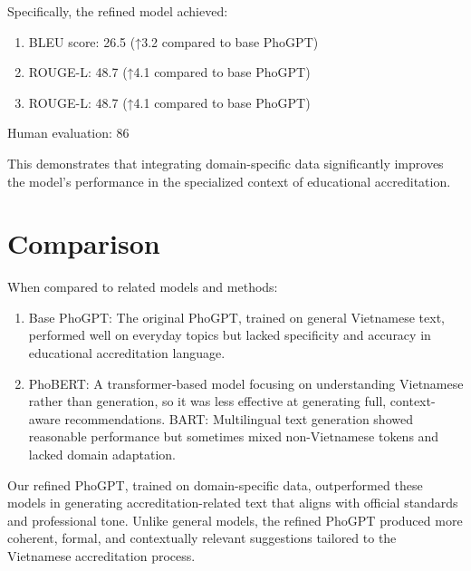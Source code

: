 Specifically, the refined model achieved:

\begin{enumerate}
    \item BLEU score: 26.5 (↑3.2 compared to base PhoGPT)
    \item ROUGE-L: 48.7 (↑4.1 compared to base PhoGPT)
    \item ROUGE-L: 48.7 (↑4.1 compared to base PhoGPT)
\end{enumerate}

Human evaluation: 86%

This demonstrates that integrating domain-specific data significantly improves the model's performance in the specialized context of educational accreditation.
\section{Comparison}
When compared to related models and methods:

\begin{enumerate}
    \item Base PhoGPT: The original PhoGPT, trained on general Vietnamese text, performed well on everyday topics but lacked specificity and accuracy in educational accreditation language.
    \item PhoBERT: A transformer-based model focusing on understanding Vietnamese rather than generation, so it was less effective at generating full, context-aware recommendations.
    \itemm BART: Multilingual text generation showed reasonable performance but sometimes mixed non-Vietnamese tokens and lacked domain adaptation.
\end{enumerate}
    
Our refined PhoGPT, trained on domain-specific data, outperformed these models in generating accreditation-related text that aligns with official standards and professional tone. Unlike general models, the refined PhoGPT produced more coherent, formal, and contextually relevant suggestions tailored to the Vietnamese accreditation process.